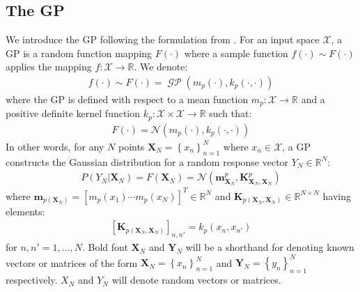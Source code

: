 \documentclass{article}
\newcommand{\GP}{\operatorname{\mathcal{GP}}}
\numberwithin{equation}{section}
\begin{document}
\subsection{The GP}\label{section:the-gp}
We introduce the GP following the formulation from \cite{rasmussen2003gaussian}. For an input space $\mathcal{X}$, a GP is a random function mapping $F(\cdot)$ where a sample function $f(\cdot) \sim F(\cdot)$ applies the mapping $f: \mathcal{X} \rightarrow \mathbb{R}$. We denote:
\begin{align}
    f(\cdot) \sim F(\cdot) = \GP\left(m_p(\cdot), k_p(\cdot, \cdot)\right)
    \label{gp}
\end{align}
where the GP is defined with respect to a mean function $m_p: \mathcal{X} \rightarrow \mathbb{R}$ and a positive definite kernel function $k_p: \mathcal{X} \times \mathcal{X} \rightarrow \mathbb{R}$ such that:
\begin{align}
    F(\cdot) = \mathcal{N}(m_p(\cdot), k_p(\cdot, \cdot))
    \label{gp-normal}
\end{align}
In other words, for any $N$ points $\mathbf{X}_N = \left\{ x_n\right\}_{n=1}^N$ where $x_n \in \mathcal{X}$, a GP constructs the Gaussian distribution for a random response vector $Y_N \in \mathbb{R}^{N}$:
\begin{align}
    \label{gp-vector}
    P\left(Y_N \vert \mathbf{X}_N\right) = F\left( \mathbf{X}_N\right) = \mathcal{N}\left(\mathbf{m}^p_{\mathbf{X}_N}, \mathbf{K}^p_{\mathbf{X}_N, \mathbf{X}_N}\right)
\end{align}
where $\mathbf{m}_{p(\mathbf{X}_N)} = \left[ m_p(x_1) \cdots m_p(x_N)\right]^T \in \mathbb{R}^N$ and $\mathbf{K}_{p(\mathbf{X}_N, \mathbf{X}_N)} \in \mathbb{R}^{N \times N}$ having elements:
\begin{align}
    \left[\mathbf{K}_{p(\mathbf{X}_N, \mathbf{X}_N)}\right]_{n, n'} = k_p(x_n, x_{n'})
\end{align}
for $n, n'=1,\dots, N$. Bold font $\mathbf{X}_N$ and $\mathbf{Y}_N$ will be a shorthand for denoting known vectors or matrices of the form $\mathbf{X}_N = \left\{ x_n\right\}_{n=1}^N$ and $\mathbf{Y}_N = \left\{ y_n\right\}_{n=1}^N$ respectively. $X_N$ and $Y_N$ will denote random vectors or matrices.
\end{document}
